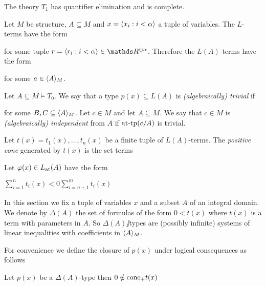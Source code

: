 \documentclass[creche.tex]{subfiles}
\begin{document}
\begin{corollary}
The theory $T_1$ has quantifier elimination and is complete.
\end{corollary}

Let $M$ be structure, $A\subseteq M$ and $x=\<x_i:i<\alpha\>$ a tuple of variables. The $L$-terms have the form 


for some tuple $r=\<r_i:i<\alpha\>\in\RR^{\oplus\alpha}$. Therefore the $L(A)$-terms have the form 


for some $a\in\<A\>_M$. 

Let $A\subseteq M\models T_0$. We say that a type $p(x)\subseteq L(A)$ is \emph{(algebraically) trivial\/} if 


for some $B,C\subseteq\<A\>_M$. Let $c\in M$ and let $A\subseteq M$. We say that $c\in M$ is \emph{(algebraically) independent\/} from $A$ if $\attp(c/A)$ is trivial.  

Let $t(x)=t_1(x),\dots,t_n(x)$ be a finite tuple of $L(A)$-terms. The \emph{positive cone\/} generated by $t(x)$ is the set terms 

\def\cone{{\rm cone_+}}

\begin{proposition}
Let $\phi(x)\in L_{\rm at}(A)$ have the form

$\displaystyle\sum^n_{i=1}t_i(x)<0 \sum^m_{i=n+1}t_i(x)$
\end{proposition}



In this section we fix a tuple of variables \emph{$x$\/} and a subset \emph{$A$} of an integral domain. We denote by \emph{$\Delta(A)$\/} the set of formulas of the form $0<t(x)$ where $t(x)$ is a term with parameters in $A$. So $\Delta(A)\jj$types are (possibly infinite) systems of linear inequalities with coefficients in $\<A\>_M$. 

For convenience we define the closure of $p(x)$ under logical consequences as follows



\begin{proposition}
Let $p(x)$ be a $\Delta(A)$-type then $0\notin \cone t(x)$ 
\end{proposition}
\end{document}
